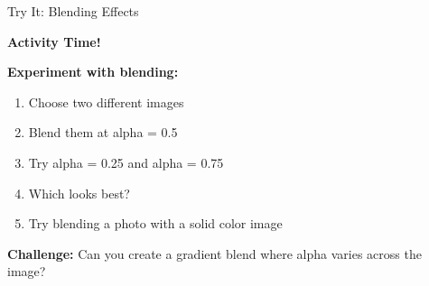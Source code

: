 \documentclass{csbeamer}
\begin{document}
\begin{frame}[fragile]{Try It: Blending Effects}
    \begin{center}
        \Large \textbf{Activity Time!}
    \end{center}

    \vspace{1em}

    \textbf{Experiment with blending:}
    \begin{enumerate}
        \item Choose two different images
        \item Blend them at alpha = 0.5
        \item Try alpha = 0.25 and alpha = 0.75
        \item Which looks best?
        \item Try blending a photo with a solid color image
    \end{enumerate}

    \vspace{1em}

    \textbf{Challenge:} Can you create a gradient blend where alpha varies across the image?
\end{frame}
\end{document}
